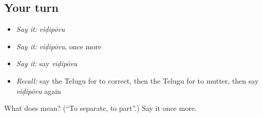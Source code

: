 \subsection*{Your turn}
\begin{itemize}
\raggedright
  \item \emph{Say it:} \emph{viḍipōvu}
  \item \emph{Say it:} \emph{viḍipōvu}, once more
  \item \emph{Say it:} say \emph{viḍipōvu}
  \item \emph{Recall:} say the Telugu for to correct, then the Telugu for to mutter, then say \emph{viḍipōvu} again
\end{itemize}

\begin{tcolorbox}[breakable,colback=teal!4,colframe=teal!35!black,title={Before you move on}]
What does  mean? (\textquotedblleft{}To separate, to part\textquotedblright{}.) Say it once more.
\end{tcolorbox}
